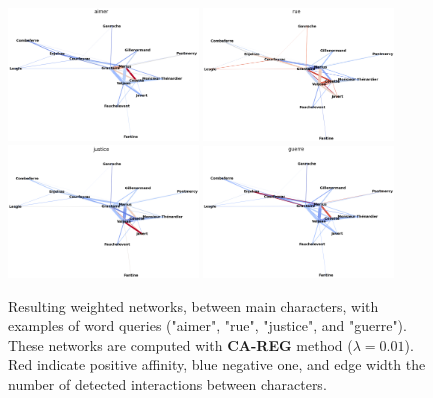 \documentclass[
twocolumn,
]{ceurart}
\begin{document}
\begin{figure}[!bh]
	\centering
	\includegraphics[width=0.45\textwidth]{fig/aimer.png} \includegraphics[width=0.45\textwidth]{fig/rue.png}
	\includegraphics[width=0.45\textwidth]{fig/justice.png}
	\includegraphics[width=0.45\textwidth]{fig/guerre.png}
	\label{networks}
	\caption{Resulting weighted networks, between main characters, with examples of word queries ("aimer", "rue", "justice", and "guerre"). These networks are computed with \textbf{CA-REG} method ($\lambda = 0.01$). Red indicate positive affinity, blue negative one, and edge width the number of detected interactions between characters.}
\end{figure}
\end{document}
